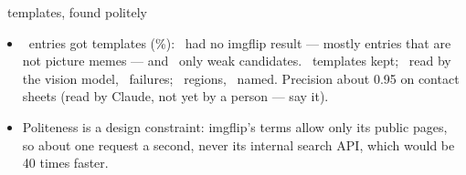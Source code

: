 \begin{frame}{\NTemplates\ templates, found politely}
{\begin{itemize}
    \item \NFramesSelected\ entries got templates (\NFramesSelectedPct\%): \NNoResults\ had no imgflip result --- mostly
      entries that are not picture memes --- and \NBelowThreshold\ only weak candidates. \NTemplates\ templates
      kept; \NRead\ read by the vision model, \NReadFailed\ failures; \NRegions\ regions, \NNamed\ named. Precision about 0.95 on
      contact sheets (read by Claude, not yet by a person --- say it).
    \item Politeness is a design constraint: imgflip's terms allow only its public pages, so about
      one request a second, never its internal search API, which would be 40 times faster.
  \end{itemize}}
\end{frame}
